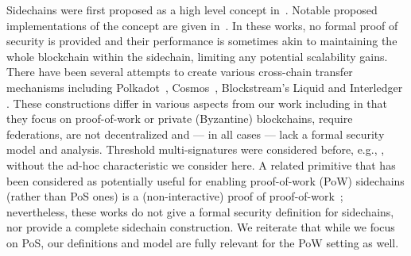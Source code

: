Sidechains were first proposed as a high level concept in~\cite{sidechains}.
Notable proposed implementations of the concept are given in~\cite{drivechains,lerner}.
In these works, no formal proof of security
is provided and their performance is sometimes akin to maintaining the whole
blockchain within the sidechain, limiting any potential scalability gains.
%
There have been several attempts to create various cross-chain transfer
mechanisms including Polkadot~\cite{polkadot},
Cosmos~\cite{tendermint}, Blockstream's Liquid \cite{federated-interoperability} and Interledger \cite{interledger}. These constructions  differ in various aspects from our work including in that
they focus on proof-of-work or private (Byzantine) blockchains, require
federations, are not decentralized and --- in all cases ---
 lack a formal security model and analysis.
Threshold multi-signatures were considered before, e.g., \cite{pass-asynchronous},
without the ad-hoc characteristic we consider here.
A related primitive that has been considered as potentially useful for enabling
proof-of-work (PoW) sidechains (rather than PoS ones) is a (non-interactive) proof of
proof-of-work~\cite{popow,nipopows}; nevertheless,  these works do not give a
formal security definition for sidechains, nor provide a complete sidechain
construction. We reiterate that while we focus on  PoS, our definitions and model
are fully relevant for the PoW setting as well.
